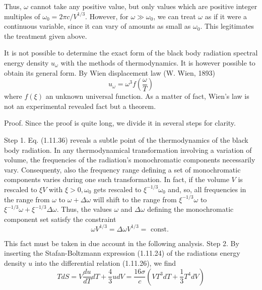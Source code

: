\documentclass{article}
\begin{document}
Thus, $\omega$ cannot take any positive value, but only values which are positive integer multiples of $\omega_{0}=2 \pi c / V^{1 / 3}$. However, for $\omega \gg \omega_{0}$, we can treat $\omega$ as if it were a continuous variable, since it can vary of amounts as small as $\omega_{0}$. This legitimates the treatment given above.

It is not possible to determine the exact form of the black body radiation spectral energy density $u_{\omega}$ with the methods of thermodynamics. It is however possible to obtain its general form. By Wien displacement law (W. Wien, 1893)
$$
\begin{equation*}
u_{\omega}=\omega^{3} f\left(\frac{\omega}{T}\right) \tag{1.11.37}
\end{equation*}
$$
where $f(\xi)$ an unknown universal function. As a matter of fact, Wien's law is not an experimental revealed fact but a theorem.

Proof. Since the proof is quite long, we divide it in several steps for clarity.

Step 1. Eq. (1.11.36) reveals a subtle point of the thermodynamics of the black body radiation. In any thermodynamical transformation involving a variation of volume, the frequencies of the radiation's monochromatic components necessarily vary. Consequenty, also the frequency range defining a set of monochromatic components varies during one such transformation. In fact, if the volume $V$ is rescaled to $\xi V$ with $\xi>0, \omega_{0}$ gets rescaled to $\xi^{-1 / 3} \omega_{0}$ and, so, all frequencies in the range from $\omega$ to $\omega+\Delta \omega$ will shift to the range from $\xi^{-1 / 3} \omega$ to $\xi^{-1 / 3} \omega+\xi^{-1 / 3} \Delta \omega$. Thus, the values $\omega$ and $\Delta \omega$ defining the monochromatic component set satisfy the constraint
$$
\begin{equation*}
\omega V^{1 / 3}=\Delta \omega V^{1 / 3}=\text { const. } \tag{1.11.38}
\end{equation*}
$$

This fact must be taken in due account in the following analysis.
Step 2. By inserting the Stafan-Boltzmann expression (1.11.24) of the radiations energy density $u$ into the differential relation (1.11.26), we find
$$
\begin{equation*}
T d S=V \frac{d u}{d T} d T+\frac{4}{3} u d V=\frac{16 \sigma}{c}\left(V T^{3} d T+\frac{1}{3} T^{4} d V\right) \tag{1.11.39}
\end{equation*}
$$
\end{document}
